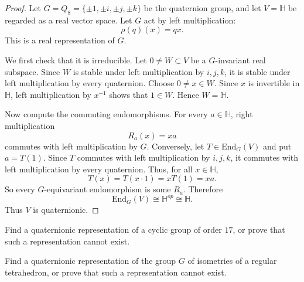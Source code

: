 \begin{proof}
Let $G=Q_8=\{\pm 1,\pm i,\pm j,\pm k\}$ be
the quaternion group, and let $V=\mathbb{H}$
be regarded as a real vector space. Let
$G$ act by left multiplication:
$$
\rho(q)(x)=qx.
$$
This is a real representation of $G$.

We first check that it is irreducible. Let
$0\neq W\subset V$ be a $G$-invariant real
subspace. Since $W$ is stable under left
multiplication by $i,j,k$, it is stable
under left multiplication by every
quaternion.
Choose $0\neq x\in W$. Since $x$ is
invertible in $\mathbb{H}$, left
multiplication by $x^{-1}$ shows that
$1\in W$. Hence $W=\mathbb{H}$.

Now compute the commuting endomorphisms.
For every $a\in \mathbb{H}$, right
multiplication
$$
R_a(x)=xa
$$
commutes with left multiplication by $G$.
Conversely, let $T\in \text{End}_G(V)$ and
put $a=T(1)$. Since $T$ commutes with left
multiplication by $i,j,k$, it commutes with
left multiplication by every quaternion.
Thus, for all $x\in\mathbb{H}$,
$$
T(x)=T(x\cdot 1)=xT(1)=xa.
$$
So every $G$-equivariant endomorphism is
some $R_a$. Therefore
$$
\text{End}_G(V)\cong \mathbb{H}^{op}
\cong \mathbb{H}.
$$
Thus $V$ is quaternionic.
\end{proof}

\begin{exercise}
\label{exercise-quaternionic-cyclic-17}
Find a quaternionic representation of a
cyclic group of order $17$, or prove that
such a representation cannot exist.
\end{exercise}

\begin{exercise}
\label{exercise-quaternionic-tetrahedron}
Find a quaternionic representation of the
group $G$ of isometries of a regular
tetrahedron, or prove that such a
representation cannot exist.
\end{exercise}


